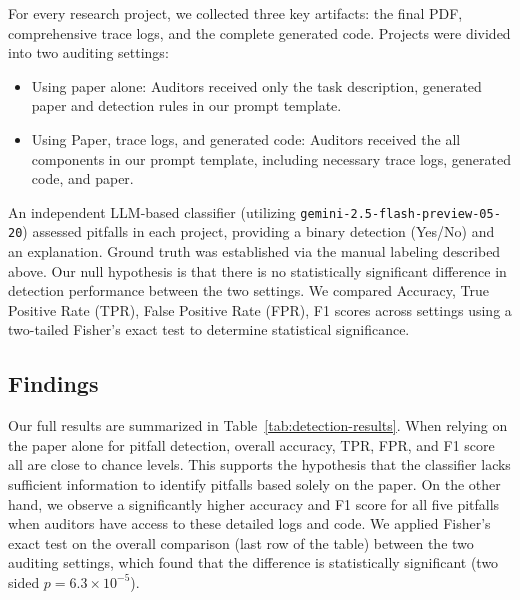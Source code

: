 \documentclass[10pt]{article}
\begin{document}
For every research project, we collected three key artifacts: the final PDF, comprehensive trace logs, and the complete generated code.
Projects were divided into two auditing settings:
\begin{itemize}
    \item Using paper alone: Auditors received only the task description, generated paper and detection rules in our prompt template.
    \item Using Paper, trace logs, and generated code: Auditors received the all components in our prompt template, including necessary trace logs, generated code, and paper.
\end{itemize}


An independent LLM-based classifier (utilizing \texttt{gemini-2.5-flash-preview-05-20}) assessed pitfalls in each project, providing a binary detection (Yes/No) and an explanation. Ground truth was established via the manual labeling described above.  
Our null hypothesis is that there is no statistically significant
difference in detection performance between the two settings.
We compared Accuracy, True Positive Rate (TPR), False Positive Rate (FPR), F1 scores across settings using a two-tailed Fisher's exact test to determine statistical significance.

\subsection{Findings}
Our full results are summarized in Table~\ref{tab:detection-results}. When relying on the paper alone for pitfall detection, overall accuracy, TPR, FPR, and F1 score all are close to chance levels. This supports the hypothesis that the classifier lacks sufficient information to identify pitfalls based solely on the paper. On the other hand, we observe a significantly higher accuracy and F1 score for all five pitfalls when auditors have access to these detailed logs and code. 
We applied Fisher's exact test on the overall comparison (last row of the table) between the two auditing settings, which found that the  difference is statistically significant (two sided $p = 6.3 \times 10^{-5}$). 
\end{document}
